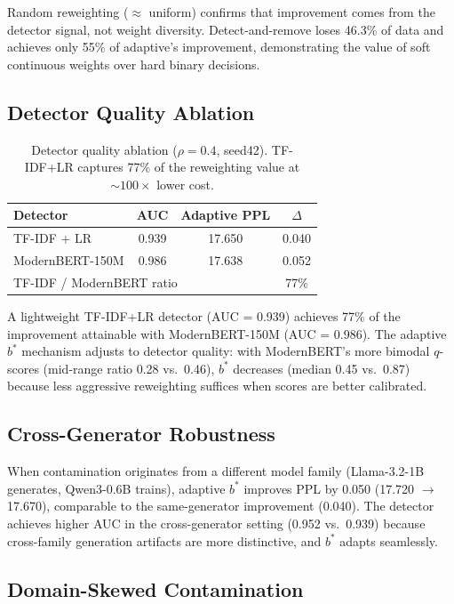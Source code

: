 \documentclass[11pt,a4paper]{article}
\newcommand{\bstar}{b^{*}}
\begin{document}
Random reweighting ($\approx$ uniform) confirms that improvement comes from the detector signal, not weight diversity.
Detect-and-remove loses 46.3\% of data and achieves only 55\% of adaptive's improvement, demonstrating the value of soft continuous weights over hard binary decisions.


\subsection{Detector Quality Ablation}
\label{sec:detector}

\begin{table}[t]
\centering
\small
\caption{Detector quality ablation ($\rho{=}0.4$, seed42). TF-IDF+LR captures 77\% of the reweighting value at ${\sim}100\times$ lower cost.}
\label{tab:detector}
\begin{tabular}{lccc}
\toprule
\textbf{Detector} & \textbf{AUC} & \textbf{Adaptive PPL} & $\Delta$ \\
\midrule
TF-IDF + LR     & 0.939 & 17.650 & 0.040 \\
ModernBERT-150M  & 0.986 & 17.638 & 0.052 \\
\midrule
\multicolumn{3}{l}{TF-IDF / ModernBERT ratio} & 77\% \\
\bottomrule
\end{tabular}
\end{table}

A lightweight TF-IDF+LR detector (AUC = 0.939) achieves 77\% of the improvement attainable with ModernBERT-150M (AUC = 0.986).
The adaptive $\bstar$ mechanism adjusts to detector quality: with ModernBERT's more bimodal $q$-scores (mid-range ratio 0.28 vs.\ 0.46), $\bstar$ decreases (median 0.45 vs.\ 0.87) because less aggressive reweighting suffices when scores are better calibrated.


\subsection{Cross-Generator Robustness}
\label{sec:cross_gen}

When contamination originates from a different model family (Llama-3.2-1B generates, Qwen3-0.6B trains), adaptive $\bstar$ improves PPL by 0.050 (17.720 $\to$ 17.670), comparable to the same-generator improvement (0.040).
The detector achieves higher AUC in the cross-generator setting (0.952 vs.\ 0.939) because cross-family generation artifacts are more distinctive, and $\bstar$ adapts seamlessly.


\subsection{Domain-Skewed Contamination}
\label{sec:domain}
\end{document}

